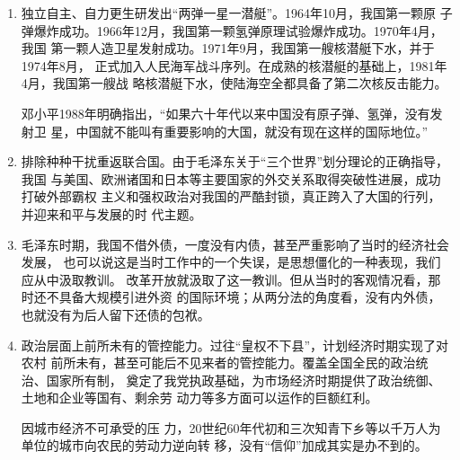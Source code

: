 \begin{enumerate}
\item 独立自主、自力更生研发出“两弹一星一潜艇”。1964年10月，我国第一颗原
  子弹爆炸成功。1966年12月，我国第一颗氢弹原理试验爆炸成功。1970年4月，我国
  第一颗人造卫星发射成功。1971年9月，我国第一艘核潜艇下水，并于1974年8月，
  正式加入人民海军战斗序列。在成熟的核潜艇的基础上，1981年4月，我国第一艘战
  略核潜艇下水，使陆海空全都具备了第二次核反击能力。

  邓小平1988年明确指出，“如果六十年代以来中国没有原子弹、氢弹，没有发射卫
  星，中国就不能叫有重要影响的大国，就没有现在这样的国际地位。”


\item 排除种种干扰重返联合国。由于毛泽东关于“三个世界”划分理论的正确指导，我国
  与美国、欧洲诸国和日本等主要国家的外交关系取得突破性进展，成功打破外部霸权
  主义和强权政治对我国的严酷封锁，真正跨入了大国的行列，并迎来和平与发展的时
  代主题。

\item 毛泽东时期，我国不借外债，一度没有内债，甚至严重影响了当时的经济社会发展，
  也可以说这是当时工作中的一个失误，是思想僵化的一种表现，我们应从中汲取教训。
  改革开放就汲取了这一教训。但从当时的客观情况看，那时还不具备大规模引进外资
  的国际环境；从两分法的角度看，没有内外债，也就没有为后人留下还债的包袱。

\item 政治层面上前所未有的管控能力。过往“皇权不下县”，计划经济时期实现了对农村
  前所未有，甚至可能后不见来者的管控能力。覆盖全国全民的政治统治、国家所有制，
  奠定了我党执政基础，为市场经济时期提供了政治统御、土地和企业等国有、剩余劳
  动力等多方面可以运作的巨额红利。

  因城市经济不可承受的压
  力，20世纪60年代初和三次知青下乡等以千万人为单位的城市向农民的劳动力逆向转
  移，没有“信仰”加成其实是办不到的。
\end{enumerate}
